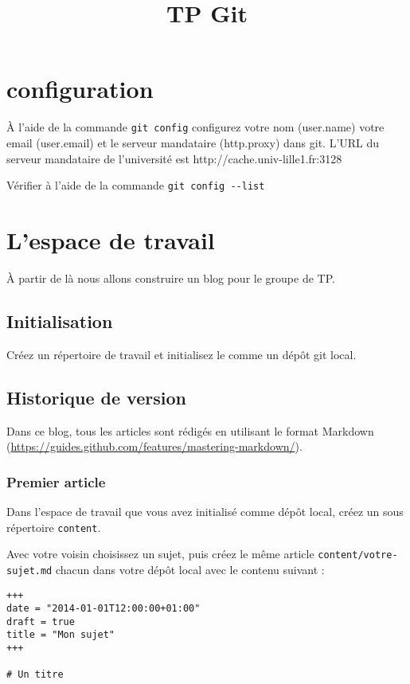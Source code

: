 \documentclass[a4paper]{article}
\title{TP Git}
\date{}
\begin{document}
\maketitle

\section{configuration}

À l'aide de la commande \verb|git config| configurez votre nom (user.name) votre email (user.email) et le serveur mandataire (http.proxy) dans git. L'URL du serveur mandataire de l'université est http://cache.univ-lille1.fr:3128

Vérifier à l'aide de la commande \verb|git config --list|

\section{L'espace de travail}

À partir de là nous allons construire un blog pour le groupe de TP.

\subsection{Initialisation}
Créez un répertoire de travail et initialisez le comme un dépôt git local.

\subsection{Historique de version}
Dans ce blog, tous les articles sont rédigés en utilisant le format Markdown (\url{https://guides.github.com/features/mastering-markdown/}).

\subsubsection{Premier article}
Dans l'espace de travail que vous avez initialisé comme dépôt local, créez un sous répertoire \verb|content|.

Avec votre voisin choisissez un sujet, puis créez le même article \verb|content/votre-sujet.md| chacun dans votre dépôt local avec le contenu suivant : 

\begin{verbatim}
+++
date = "2014-01-01T12:00:00+01:00"
draft = true
title = "Mon sujet"
+++

# Un titre
\end{verbatim}
\end{document}
